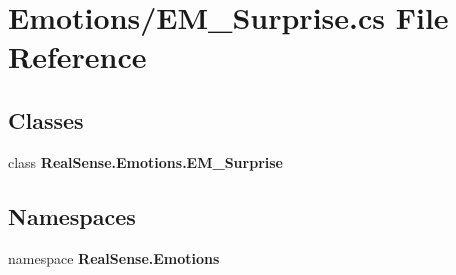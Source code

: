 \section{Emotions/\+E\+M\+\_\+\+Surprise.cs File Reference}
\label{_e_m___surprise_8cs}
\subsection*{Classes}
\begin{DoxyCompactItemize}
\item 
class \textbf{ Real\+Sense.\+Emotions.\+E\+M\+\_\+\+Surprise}
\end{DoxyCompactItemize}
\subsection*{Namespaces}
\begin{DoxyCompactItemize}
\item 
namespace \textbf{ Real\+Sense.\+Emotions}
\end{DoxyCompactItemize}
